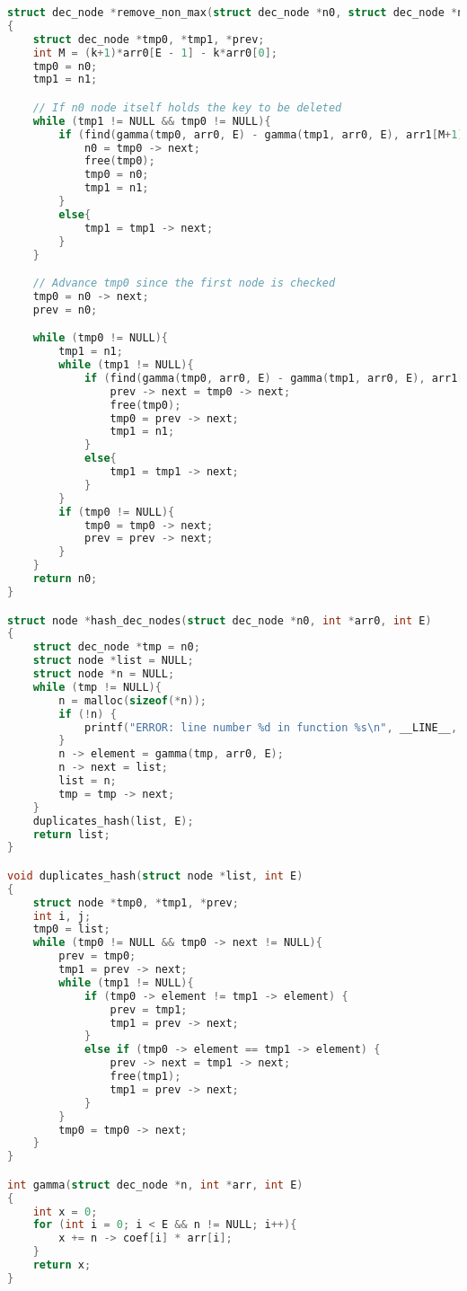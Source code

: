 \begin{lstlisting}[language=C]
struct dec_node *remove_non_max(struct dec_node *n0, struct dec_node *n1, int *arr0, struct node **arr1, int E, int k)
{
    struct dec_node *tmp0, *tmp1, *prev;
    int M = (k+1)*arr0[E - 1] - k*arr0[0];
    tmp0 = n0;
    tmp1 = n1;

    // If n0 node itself holds the key to be deleted
    while (tmp1 != NULL && tmp0 != NULL){
        if (find(gamma(tmp0, arr0, E) - gamma(tmp1, arr0, E), arr1[M+1], arr0, E)){
            n0 = tmp0 -> next;
            free(tmp0);
            tmp0 = n0;
            tmp1 = n1;
        }
        else{
            tmp1 = tmp1 -> next;
        }
    }

    // Advance tmp0 since the first node is checked
    tmp0 = n0 -> next;
    prev = n0;

    while (tmp0 != NULL){
        tmp1 = n1;
        while (tmp1 != NULL){
            if (find(gamma(tmp0, arr0, E) - gamma(tmp1, arr0, E), arr1[M+1], arr0, E)){
                prev -> next = tmp0 -> next;
                free(tmp0);
                tmp0 = prev -> next;
                tmp1 = n1;
            }
            else{
                tmp1 = tmp1 -> next;
            }
        }
        if (tmp0 != NULL){
            tmp0 = tmp0 -> next;
            prev = prev -> next;
        }
    }
    return n0;
}

struct node *hash_dec_nodes(struct dec_node *n0, int *arr0, int E)
{
    struct dec_node *tmp = n0;
    struct node *list = NULL;
    struct node *n = NULL;
    while (tmp != NULL){
        n = malloc(sizeof(*n));
        if (!n) {
            printf("ERROR: line number %d in function %s\n", __LINE__, __func__);
        }
        n -> element = gamma(tmp, arr0, E);
        n -> next = list;
        list = n;
        tmp = tmp -> next;
    }
    duplicates_hash(list, E);
    return list;
}

void duplicates_hash(struct node *list, int E)
{
    struct node *tmp0, *tmp1, *prev;
    int i, j;
    tmp0 = list;
    while (tmp0 != NULL && tmp0 -> next != NULL){
        prev = tmp0;
        tmp1 = prev -> next;
        while (tmp1 != NULL){
            if (tmp0 -> element != tmp1 -> element) {
                prev = tmp1;
                tmp1 = prev -> next;
            }
            else if (tmp0 -> element == tmp1 -> element) {
                prev -> next = tmp1 -> next;
                free(tmp1);
                tmp1 = prev -> next;
            }
        }
        tmp0 = tmp0 -> next;
    }
}

int gamma(struct dec_node *n, int *arr, int E)
{
    int x = 0;
    for (int i = 0; i < E && n != NULL; i++){
        x += n -> coef[i] * arr[i];
    }
    return x;
}


\end{lstlisting}
